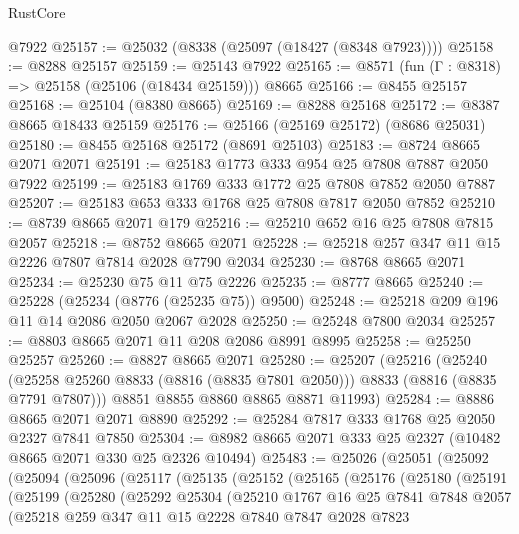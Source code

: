 \begin{lexlean}{RustCore}
\begin{coremodule}
    @7922
@25157 := @25032 (@8338 (@25097 (@18427 (@8348 @7923))))
@25158 := @8288 @25157
@25159 := @25143 @7922
@25165 := @8571 (fun (Γ : @8318) => @25158 (@25106 (@18434 @25159))) @8665
@25166 := @8455 @25157
@25168 := @25104 (@8380 @8665)
@25169 := @8288 @25168
@25172 := @8387 @8665 @18433 @25159
@25176 := @25166 (@25169 @25172) (@8686 @25031)
@25180 := @8455 @25168 @25172 (@8691 @25103)
@25183 := @8724 @8665 @2071 @2071
@25191 := @25183 @1773 @333 @954 @25 @7808 @7887 @2050 @7922
@25199 := @25183 @1769 @333 @1772 @25 @7808 @7852 @2050 @7887
@25207 := @25183 @653 @333 @1768 @25 @7808 @7817 @2050 @7852
@25210 := @8739 @8665 @2071 @179
@25216 := @25210 @652 @16 @25 @7808 @7815 @2057
@25218 := @8752 @8665 @2071
@25228 := @25218 @257 @347 @11 @15 @2226 @7807 @7814 @2028 @7790 @2034
@25230 := @8768 @8665 @2071
@25234 := @25230 @75 @11 @75 @2226
@25235 := @8777 @8665
@25240 := @25228 (@25234 (@8776 (@25235 @75)) @9500)
@25248 := @25218 @209 @196 @11 @14 @2086 @2050 @2067 @2028
@25250 := @25248 @7800 @2034
@25257 := @8803 @8665 @2071 @11 @208 @2086 @8991 @8995
@25258 := @25250 @25257
@25260 := @8827 @8665 @2071
@25280 := @25207
    (@25216
      (@25240 (@25258 @25260 @8833 (@8816 (@8835 @7801 @2050))) @8833 (@8816 (@8835 @7791 @7807)))
      @8851
      @8855
      @8860
      @8865
      @8871
      @11993)
@25284 := @8886 @8665 @2071 @2071 @8890
@25292 := @25284 @7817 @333 @1768 @25 @2050 @2327 @7841 @7850
@25304 := @8982 @8665 @2071 @333 @25 @2327 (@10482 @8665 @2071 @330 @25 @2326 @10494)
@25483 := @25026
    (@25051
      (@25092
        (@25094
          (@25096
            (@25117
              (@25135
                (@25152
                  (@25165
                    (@25176
                      (@25180
                        (@25191
                          (@25199
                            (@25280
                              (@25292
                                @25304
                                (@25210
                                  @1767
                                  @16
                                  @25
                                  @7841
                                  @7848
                                  @2057
                                  (@25218
                                    @259
                                    @347
                                    @11
                                    @15
                                    @2228
                                    @7840
                                    @7847
                                    @2028
                                    @7823

\end{coremodule}
\end{lexlean}
